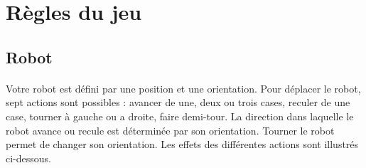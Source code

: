 \documentclass[a4paper]{article}
\begin{document}
\section{Règles du jeu}

\subsection{Robot}
\label{sec:robotactions}

\paragraph{} Votre robot est défini par une position et une orientation. Pour
déplacer le robot, sept actions sont possibles : avancer de une, deux ou trois
cases, reculer de une case, tourner à gauche ou a droite, faire demi-tour. La
direction dans laquelle le robot avance ou recule est déterminée par son
orientation. Tourner le robot permet de changer son orientation. Les effets des
différentes actions sont illustrés ci-dessous.
\end{document}
